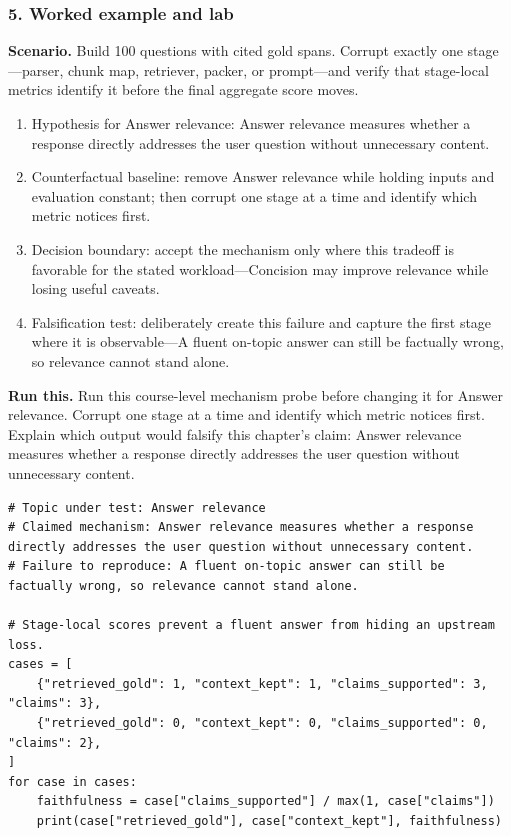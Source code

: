 \subsubsection*{5. Worked example and lab}
\textbf{Scenario.} Build 100 questions with cited gold spans. Corrupt exactly one stage—parser, chunk map, retriever, packer, or prompt—and verify that stage-local metrics identify it before the final aggregate score moves.
\begin{enumerate}
\item Hypothesis for Answer relevance: Answer relevance measures whether a response directly addresses the user question without unnecessary content.
\item Counterfactual baseline: remove Answer relevance while holding inputs and evaluation constant; then corrupt one stage at a time and identify which metric notices first.
\item Decision boundary: accept the mechanism only where this tradeoff is favorable for the stated workload—Concision may improve relevance while losing useful caveats.
\item Falsification test: deliberately create this failure and capture the first stage where it is observable—A fluent on-topic answer can still be factually wrong, so relevance cannot stand alone.
\end{enumerate}
\textbf{Run this.} Run this course-level mechanism probe before changing it for Answer relevance. Corrupt one stage at a time and identify which metric notices first. Explain which output would falsify this chapter's claim: Answer relevance measures whether a response directly addresses the user question without unnecessary content.
\begin{Verbatim}[fontsize=\scriptsize]
# Topic under test: Answer relevance
# Claimed mechanism: Answer relevance measures whether a response directly addresses the user question without unnecessary content.
# Failure to reproduce: A fluent on-topic answer can still be factually wrong, so relevance cannot stand alone.

# Stage-local scores prevent a fluent answer from hiding an upstream loss.
cases = [
    {"retrieved_gold": 1, "context_kept": 1, "claims_supported": 3, "claims": 3},
    {"retrieved_gold": 0, "context_kept": 0, "claims_supported": 0, "claims": 2},
]
for case in cases:
    faithfulness = case["claims_supported"] / max(1, case["claims"])
    print(case["retrieved_gold"], case["context_kept"], faithfulness)
\end{Verbatim}
